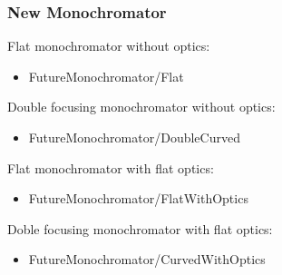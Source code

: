 \subsubsection{New Monochromator}
Flat monochromator without optics:
\begin{itemize}
\item FutureMonochromator/Flat
\end{itemize}
Double focusing monochromator without optics:
\begin{itemize}
\item FutureMonochromator/DoubleCurved
\end{itemize}
Flat monochromator with flat optics:
\begin{itemize}
\item FutureMonochromator/FlatWithOptics
\end{itemize}
Doble focusing monochromator with flat optics:
\begin{itemize}
\item FutureMonochromator/CurvedWithOptics
\end{itemize}
\label{sidsteSide}